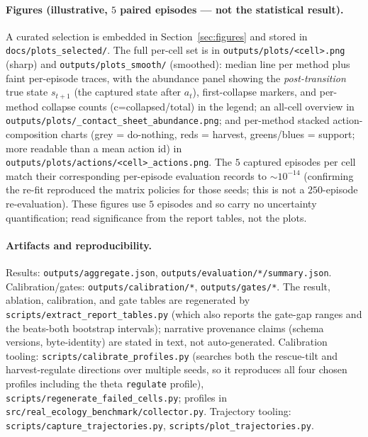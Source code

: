 \documentclass[11pt]{article}
\begin{document}
\paragraph{Figures (illustrative, $5$ paired episodes --- not the statistical
result).} A curated selection is embedded in Section~\ref{sec:figures} and stored
in \texttt{docs/plots\_selected/}. The full per-cell set is in
\texttt{outputs/plots/<cell>.png} (sharp) and \texttt{outputs/plots\_smooth/}
(smoothed): median line per method plus faint per-episode traces, with the
abundance panel showing the
\emph{post-transition} true state $s_{t+1}$ (the captured state after $a_t$),
first-collapse markers, and per-method collapse counts (c=collapsed/total) in the
legend; an all-cell overview in
\texttt{outputs/plots/\_contact\_sheet\_abundance.png}; and per-method stacked
action-composition charts (grey = do-nothing, reds = harvest, greens/blues =
support; more readable than a mean action id) in
\texttt{outputs/plots/actions/<cell>\_actions.png}. The $5$ captured episodes per cell match their corresponding
per-episode evaluation records to $\sim\!10^{-14}$ (confirming the re-fit
reproduced the matrix policies for those seeds; this is not a $250$-episode
re-evaluation). These figures use $5$ episodes and so carry no uncertainty
quantification; read significance from the report tables, not the plots.

\paragraph{Artifacts and reproducibility.} Results: \texttt{outputs/aggregate.json},
\texttt{outputs/evaluation/*/summary.json}. Calibration/gates:
\texttt{outputs/calibration/*}, \texttt{outputs/gates/*}. The result, ablation,
calibration, and gate tables are regenerated by
\texttt{scripts/extract\_report\_tables.py} (which also reports the gate-gap ranges
and the beats-both bootstrap intervals); narrative provenance claims (schema
versions, byte-identity) are stated in text, not auto-generated. Calibration tooling:
\texttt{scripts/calibrate\_profiles.py} (searches both the rescue-tilt and
harvest-regulate directions over multiple seeds, so it reproduces all four chosen
profiles including the theta \texttt{regulate} profile),
\texttt{scripts/regenerate\_failed\_cells.py}; profiles in
\texttt{src/real\_ecology\_benchmark/collector.py}. Trajectory tooling:
\texttt{scripts/capture\_trajectories.py}, \texttt{scripts/plot\_trajectories.py}.
\end{document}
